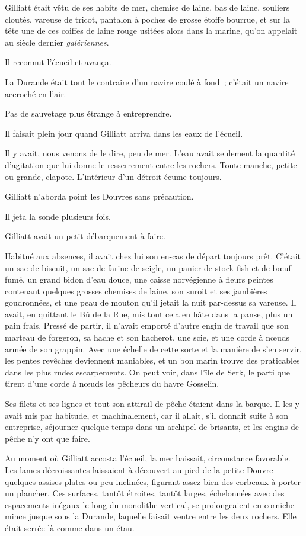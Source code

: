 \documentclass[french,twoside]{book} %
\begin{document}
Gilliatt était vêtu de ses habits de mer, chemise de laine, bas de laine, souliers cloutés, vareuse de tricot, pantalon à poches de grosse étoffe bourrue, et sur la tête une de ces coiffes de laine rouge usitées alors dans la marine, qu’on appelait au siècle dernier \emph{galériennes}.\par
Il reconnut l’écueil et avança.\par
 La Durande était tout le contraire d’un navire coulé à fond ; c’était un navire accroché en l’air.\par
Pas de sauvetage plus étrange à entreprendre.\par
Il faisait plein jour quand Gilliatt arriva dans les eaux de l’écueil.\par
Il y avait, nous venons de le dire, peu de mer. L’eau avait seulement la quantité d’agitation que lui donne le resserrement entre les rochers. Toute manche, petite ou grande, clapote. L’intérieur d’un détroit écume toujours.\par
Gilliatt n’aborda point les Douvres sans précaution.\par
Il jeta la sonde plusieurs fois.\par
Gilliatt avait un petit débarquement à faire.\par
Habitué aux absences, il avait chez lui son en-cas de départ toujours prêt. C’était un sac de biscuit, un sac de farine de seigle, un panier de stock-fish et de bœuf fumé, un grand bidon d’eau douce, une caisse norvégienne à fleurs peintes contenant quelques grosses chemises de laine, son suroit et ses jambières goudronnées, et une peau de mouton qu’il jetait la nuit par-dessus sa vareuse. Il avait, en quittant le Bû de la Rue, mis tout cela en hâte dans la panse, plus un pain frais. Pressé de partir, il n’avait emporté d’autre engin de travail que son marteau de forgeron, sa hache et son hacherot, une scie, et une corde à nœuds armée de son grappin. Avec une échelle de cette sorte et la manière de s’en servir, les pentes revêches deviennent maniables, et un bon marin trouve des praticables dans les plus rudes escarpements. On  peut voir, dans l’île de Serk, le parti que tirent d’une corde à nœuds les pêcheurs du havre Gosselin.\par
Ses filets et ses lignes et tout son attirail de pêche étaient dans la barque. Il les y avait mis par habitude, et machinalement, car il allait, s’il donnait suite à son entreprise, séjourner quelque temps dans un archipel de brisants, et les engins de pêche n’y ont que faire.\par
Au moment où Gilliatt accosta l’écueil, la mer baissait, circonstance favorable. Les lames décroissantes laissaient à découvert au pied de la petite Douvre quelques assises plates ou peu inclinées, figurant assez bien des corbeaux à porter un plancher. Ces surfaces, tantôt étroites, tantôt larges, échelonnées avec des espacements inégaux le long du monolithe vertical, se prolongeaient en corniche mince jusque sous la Durande, laquelle faisait ventre entre les deux rochers. Elle était serrée là comme dans un étau.\par
\end{document}
